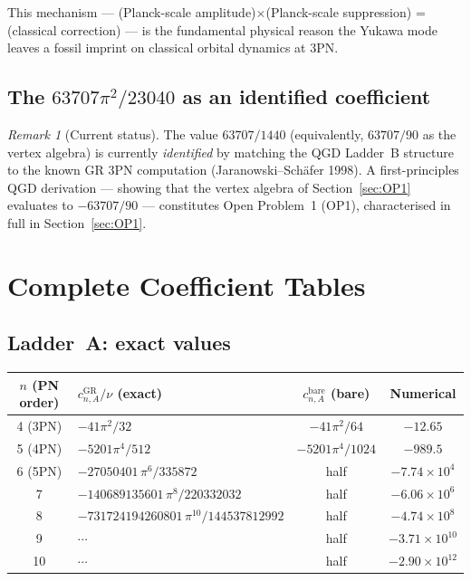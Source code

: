 \documentclass[11pt,a4paper]{article}
\theoremstyle{plain}
\theoremstyle{definition}
\theoremstyle{remark}
\newtheorem{remark}[theorem]{Remark}
\newcommand{\GR}{\mathrm{GR}}
\newcommand{\bA}{\mathrm{bare}}
\begin{document}
This mechanism --- (Planck-scale amplitude)$\times$(Planck-scale
suppression) = (classical correction) --- is the fundamental physical
reason the Yukawa mode leaves a fossil imprint on classical orbital
dynamics at 3PN.

\subsection{The $63707\pi^2/23040$ as an identified coefficient}

\begin{remark}[Current status]
The value $63707/1440$ (equivalently, $63707/90$ as the vertex algebra)
is currently \emph{identified} by matching the QGD Ladder~B structure
to the known GR 3PN computation (Jaranowski--Sch\"{a}fer 1998).
A first-principles QGD derivation --- showing that the vertex algebra
of Section~\ref{sec:OP1} evaluates to $-63707/90$ --- constitutes
Open Problem~1 (OP1), characterised in full in Section~\ref{sec:OP1}.
\end{remark}

\section{Complete Coefficient Tables}
\label{sec:tables}

\subsection{Ladder~A: exact values}

\begin{center}
\renewcommand{\arraystretch}{1.4}
\begin{tabular}{clcc}
\toprule
$n$ (PN order) & $c_{n,A}^{\GR}/\nu$ (exact)
  & $c_{n,A}^{\bA}$ (bare) & Numerical \\
\midrule
4 (3PN) & $-41\pi^2/32$ & $-41\pi^2/64$ & $-12.65$ \\
5 (4PN) & $-5201\pi^4/512$ & $-5201\pi^4/1024$ & $-989.5$ \\
6 (5PN) & $-27050401\,\pi^6/335872$ & half & $-7.74\times10^4$ \\
7 & $-140689135601\,\pi^8/220332032$ & half & $-6.06\times10^6$ \\
8 & $-731724194260801\,\pi^{10}/144537812992$ & half & $-4.74\times10^8$ \\
9 & $\cdots$ & half & $-3.71\times10^{10}$ \\
10 & $\cdots$ & half & $-2.90\times10^{12}$ \\
\bottomrule
\end{tabular}
\end{center}
\end{document}
